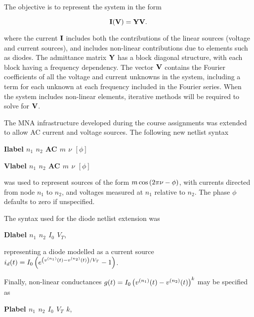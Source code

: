 \documentclass[12pt,journal,compsoc]{../ieeepaper/IEEEtran}
\begin{document}
The objective is to represent the system in the form 

\begin{equation}\label{eqn:ece1254projectReport:560}
\BI(\BV) = \BY \BV.
\end{equation}

where the current \( \mathbf{I} \) includes both the contributions of the linear sources (voltage and current sources), and includes non-linear contributions due to elements such as diodes.  The admittance matrix \( \mathbf{Y} \) has a block diagonal structure, with each block having a frequency dependency.  The vector \( \mathbf{V} \) contains the Fourier coefficients of all the voltage and current unknowns in the system, including a term for each unknown at each frequency included in the Fourier series.  When the system includes non-linear elements, iterative methods will be required to solve for \( \mathbf{V} \).

The MNA infrastructure developed during the course assignments was extended to allow AC current and voltage sources.  The following new netlist syntax

\begin{center}
\textbf{Ilabel \(n_1\) \(n_2\) AC \(m\) \(\nu\) \([\phi]\)}
\end{center} 
\begin{center}
\textbf{Vlabel \(n_1\) \(n_2\) AC \(m\) \(\nu\) \([\phi]\)}
\end{center} 

was used to represent sources of the form \( m \cos\left( 2 \pi \nu - \phi \right) \), with currents directed from node \( n_1 \) to \( n_2 \), and voltages measured at \( n_1 \) relative to \( n_2 \).  The phase \( \phi \) defaults to zero if unspecified.

The syntax used for the diode netlist extension was

\begin{center}
\textbf{Dlabel \(n_1\) \(n_2\) \(I_0\) \(V_T\)},
\end{center} 

representing a diode modelled as a current source \( i_d(t) = I_0 \left( e^{ \left(v^{(n_1)}(t) - v^{(n_2)}(t)\right)/V_T } - 1 \right) \).

Finally, non-linear conductances \( g(t) = I_0 \left(v^{(n_1)}(t) - v^{(n_2)}(t)\right)^k \) may be specified as

\begin{center}
\textbf{Plabel \(n_1\) \(n_2\) \(I_0\) \(V_T\) \( k \)},
\end{center} 
\end{document}
